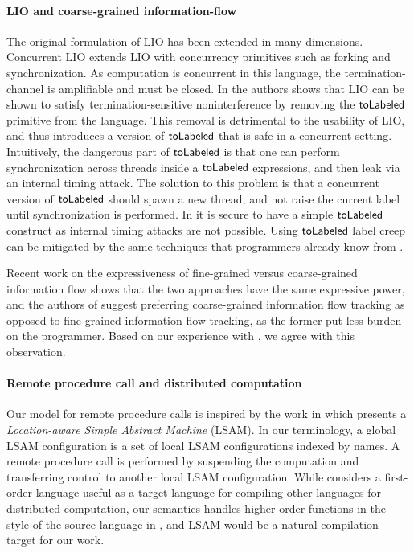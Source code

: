 \paragraph{LIO and coarse-grained information-flow}
The original formulation of LIO \cite{SRMMlio} has been extended in many dimensions. Concurrent LIO \cite{Stefan:2012:ACT:2364527.2364557} extends LIO with concurrency primitives such as forking and synchronization. As computation is concurrent in this language, the termination-channel is amplifiable and must be closed. In \cite{Stefan:2012:ACT:2364527.2364557} the authors shows that LIO can be shown to satisfy termination-sensitive noninterference by removing the $\mathsf{toLabeled}$ primitive from the language. This removal is detrimental to the usability of LIO, and thus \cite{Stefan:2012:ACT:2364527.2364557} introduces a version of $\mathsf{toLabeled}$ that is safe in a concurrent setting. Intuitively, the dangerous part of $\mathsf{toLabeled}$ is that one can perform synchronization across threads inside a $\mathsf{toLabeled}$ expressions, and then leak via an internal timing attack. The solution to this problem is that a concurrent version of $\mathsf{toLabeled}$ should spawn a new thread, and not raise the current label until synchronization is performed. In \lang{} it is secure to have a simple $\mathsf{toLabeled}$ construct as internal timing attacks are not possible. Using $\mathsf{toLabeled}$ label creep can be mitigated by the same techniques that programmers already know from \cite{SRMMlio}.

Recent work \cite{Rajani:2017:TSI:3051528.3051531} on the expressiveness of fine-grained versus coarse-grained information flow shows that the two approaches have the same expressive power, and the authors of \cite{Rajani:2017:TSI:3051528.3051531} suggest preferring coarse-grained information flow tracking as opposed to fine-grained information-flow tracking, as the former put less burden on the programmer. Based on our experience with \lang{}, we agree with this observation.

\paragraph{Remote procedure call and distributed computation}
Our model for remote procedure calls is inspired by the work in \cite{10.1007/978-3-642-25462-8_28} which presents a \emph{Location-aware Simple Abstract Machine} (LSAM). In our terminology, a global LSAM configuration is a set of local LSAM configurations indexed by names. A remote procedure call is performed by suspending the computation and transferring control to another local LSAM configuration. While \cite{10.1007/978-3-642-25462-8_28} considers a first-order language useful as a target language for compiling other languages for distributed computation, our semantics handles higher-order functions in the style of the source language in \cite{Cooper:2009:RC:1599410.1599439}, and LSAM would be a natural compilation target for our work.